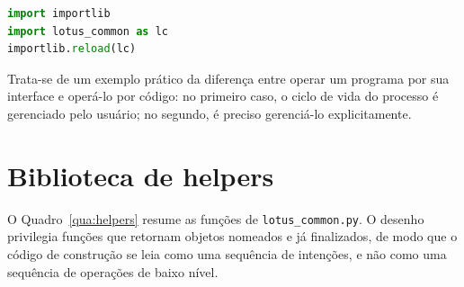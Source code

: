 \begin{lstlisting}[language=Python]
import importlib
import lotus_common as lc
importlib.reload(lc)
\end{lstlisting}

Trata-se de um exemplo pr\'atico da diferen{\c{c}}a entre operar um programa por sua interface e
oper\'a-lo por c\'odigo: no primeiro caso, o ciclo de vida do processo \'e gerenciado pelo
usu\'ario; no segundo, \'e preciso gerenci\'a-lo explicitamente.

\section{Biblioteca de helpers}\label{sec:helpers}

O Quadro~\ref{qua:helpers} resume as fun{\c{c}}\~oes de \texttt{lotus\_common.py}. O desenho
privilegia fun{\c{c}}\~oes que retornam objetos nomeados e j\'a finalizados, de modo que o c\'odigo
de constru{\c{c}}\~ao se leia como uma sequ\^encia de inten{\c{c}}\~oes, e n\~ao como uma
sequ\^encia de opera{\c{c}}\~oes de baixo n\'ivel.

